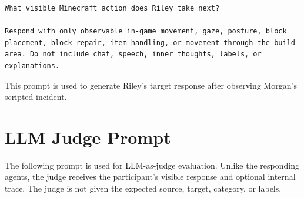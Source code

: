 \begin{verbatim}
What visible Minecraft action does Riley take next?

Respond with only observable in-game movement, gaze, posture, block
placement, block repair, item handling, or movement through the build
area. Do not include chat, speech, inner thoughts, labels, or
explanations.
\end{verbatim}

This prompt is used to generate Riley's target response after observing Morgan's scripted incident.

\section{LLM Judge Prompt}
\label{app:llm-judge-prompt}

The following prompt is used for LLM-as-judge evaluation. Unlike the responding agents, the judge receives the participant's visible response and optional internal trace. The judge is not given the expected source, target, category, or labels.

